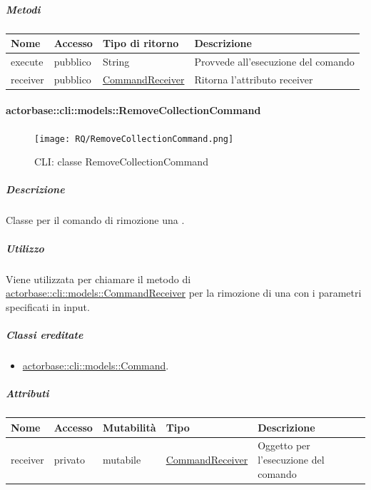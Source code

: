 \documentclass{scalatekids-article}
\begin{document}
\subparagraph{Metodi}

\begin{tabular}{| p{3cm} | p{1.5cm} | p{3.5cm} | p{9cm} |}
  \hline
  Nome & Accesso & Tipo di ritorno & Descrizione\\
  \hline
  execute & pubblico & String & Provvede all'esecuzione del comando\\
  \hline
  receiver & pubblico & \hyperref[sec:actorbase::cli::models::CommandReceiver]{CommandReceiver} & Ritorna l'attributo receiver\\
  \hline
\end{tabular}

\paragraph{actorbase::cli::models::RemoveCollectionCommand}
\label{sec:actorbase::cli::models::RemoveCollectionCommand}

\begin{figure}[H]
  \begin{center}
    \texttt{[image: RQ/RemoveCollectionCommand.png]}
    \caption{CLI: classe RemoveCollectionCommand}
  \end{center}
\end{figure}

\subparagraph{Descrizione}

Classe per il comando di rimozione una .

\subparagraph{Utilizzo}

Viene utilizzata per chiamare il metodo di
\hyperref[sec:actorbase::cli::models::CommandReceiver]{actorbase::cli::models::CommandReceiver} per la rimozione di una  con
i parametri specificati in input.

\subparagraph{Classi ereditate}

\begin{itemize}
\item \hyperref[sec:actorbase::cli::models::Command]{actorbase::cli::models::Command}.
\end{itemize}

\subparagraph{Attributi}

\begin{tabular}{| p{1cm} | p{1.5cm} | p{2cm} | p{4cm} | p{8.5cm} |}
  \hline
  Nome & Accesso & Mutabilità & Tipo & Descrizione\\
  \hline
  receiver & privato & mutabile & \hyperref[sec:actorbase::cli::models::CommandReceiver]{CommandReceiver} & Oggetto per l'esecuzione del comando\\
  \hline
\end{tabular}
\end{document}
